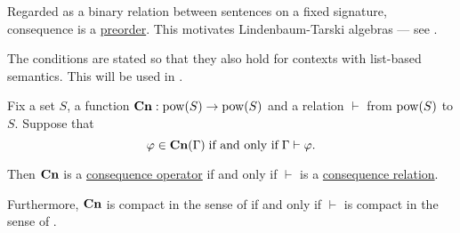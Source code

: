 \begin{comments}
  \item Regarded as a binary relation between sentences on a fixed signature, consequence is a \hyperref[def:preordered_set]{preorder}. This motivates Lindenbaum-Tarski algebras --- see .

  \item The conditions are stated so that they also hold for contexts with list-based semantics. This will be used in .
\end{comments}

\begin{proposition}\label{thm:consequence_operators_and_relations}
  Fix a set \( S \), a function \( \op*{Cn}: \pow(S) \to \pow(S) \) and a relation \( \vdash \) from \( \operatorname{pow}(S) \) to \( S \). Suppose that
  \begin{equation}\label{eq:thm:consequence_operators_and_relations}
    \varphi \in \op*{Cn}(\Gamma) \T{if and only if} \Gamma \vdash \varphi.
  \end{equation}

  Then \( \op*{Cn} \) is a \hyperref[def:consequence_operator]{consequence operator} if and only if \( {\vdash} \) is a \hyperref[def:consequence_relation]{consequence relation}.

  Furthermore, \( \op*{Cn} \) is compact in the sense of  if and only if \( \vdash \) is compact in the sense of .
\end{proposition}
